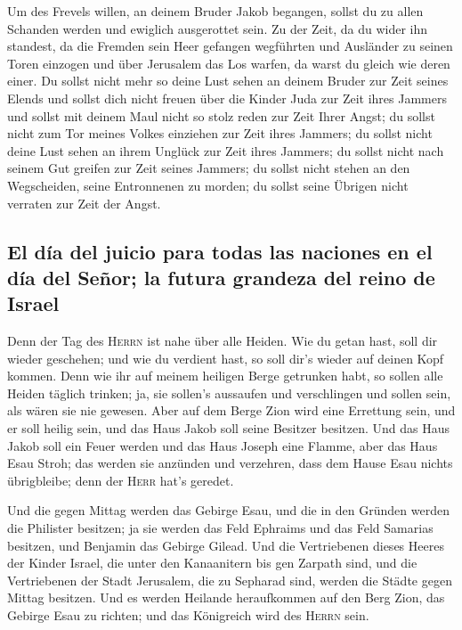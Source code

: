  Um des Frevels willen, an deinem Bruder Jakob begangen,
sollst du zu allen Schanden werden und ewiglich ausgerottet sein.
 Zu der Zeit, da du wider ihn standest, da die Fremden
sein Heer gefangen wegführten und Ausländer zu seinen Toren einzogen und
über Jerusalem das Los warfen, da warst du gleich wie deren einer.
 Du sollst nicht mehr so deine Lust sehen an deinem
Bruder zur Zeit seines Elends und sollst dich nicht freuen über die
Kinder Juda zur Zeit ihres Jammers und sollst mit deinem Maul nicht so
stolz reden zur Zeit Ihrer Angst;  du sollst nicht zum
Tor meines Volkes einziehen zur Zeit ihres Jammers; du sollst nicht
deine Lust sehen an ihrem Unglück zur Zeit ihres Jammers; du sollst
nicht nach seinem Gut greifen zur Zeit seines Jammers; 
du sollst nicht stehen an den Wegscheiden, seine Entronnenen zu morden;
du sollst seine Übrigen nicht verraten zur Zeit der Angst.

\hypertarget{el-duxeda-del-juicio-para-todas-las-naciones-en-el-duxeda-del-seuxf1or-la-futura-grandeza-del-reino-de-israel}{%
\subsection{El día del juicio para todas las naciones en el día del
Señor; la futura grandeza del reino de
Israel}\label{el-duxeda-del-juicio-para-todas-las-naciones-en-el-duxeda-del-seuxf1or-la-futura-grandeza-del-reino-de-israel}}

 Denn der Tag des \textsc{Herrn} ist nahe über alle
Heiden. Wie du getan hast, soll dir wieder geschehen; und wie du
verdient hast, so soll dir's wieder auf deinen Kopf kommen.
 Denn wie ihr auf meinem heiligen Berge getrunken habt,
so sollen alle Heiden täglich trinken; ja, sie sollen's aussaufen und
verschlingen und sollen sein, als wären sie nie gewesen. 
Aber auf dem Berge Zion wird eine Errettung sein, und er soll heilig
sein, und das Haus Jakob soll seine Besitzer besitzen. 
Und das Haus Jakob soll ein Feuer werden und das Haus Joseph eine
Flamme, aber das Haus Esau Stroh; das werden sie anzünden und verzehren,
dass dem Hause Esau nichts übrigbleibe; denn der \textsc{Herr} hat's
geredet.

 Und die gegen Mittag werden das Gebirge Esau, und die in
den Gründen werden die Philister besitzen; ja sie werden das Feld
Ephraims und das Feld Samarias besitzen, und Benjamin das Gebirge
Gilead.  Und die Vertriebenen dieses Heeres der Kinder
Israel, die unter den Kanaanitern bis gen Zarpath sind, und die
Vertriebenen der Stadt Jerusalem, die zu Sepharad sind, werden die
Städte gegen Mittag besitzen.  Und es werden Heilande
heraufkommen auf den Berg Zion, das Gebirge Esau zu richten; und das
Königreich wird des \textsc{Herrn} sein.

